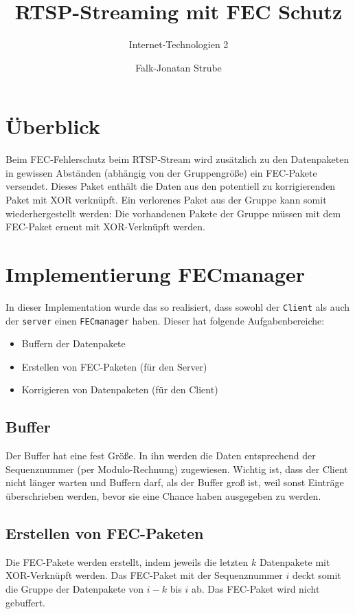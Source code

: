 \documentclass{scrartcl}
\title{RTSP-Streaming mit FEC Schutz}
\subtitle{Internet-Technologien 2}
\author{Falk-Jonatan Strube}
\begin{document}
\maketitle
\tableofcontents
\clearpage
\section{Überblick}

Beim FEC-Fehlerschutz beim RTSP-Stream wird zusätzlich zu den Datenpaketen in gewissen Abständen (abhängig von der Gruppengröße) ein FEC-Pakete versendet. Dieses Paket enthält die Daten aus den potentiell zu korrigierenden Paket mit XOR verknüpft. Ein verlorenes Paket aus der Gruppe kann somit wiederhergestellt werden: Die vorhandenen Pakete der Gruppe müssen mit dem FEC-Paket erneut mit XOR-Verknüpft werden.

\section{Implementierung FECmanager}
In dieser Implementation wurde das so realisiert, dass sowohl der \lstinline`Client` als auch der \lstinline`server` einen \lstinline`FECmanager` haben. Dieser hat folgende Aufgabenbereiche:
\begin{itemize}
\item Buffern der Datenpakete
\item Erstellen von FEC-Paketen (für den Server)
\item Korrigieren von Datenpaketen (für den Client)
\end{itemize}
\subsection{Buffer}
Der Buffer hat eine fest Größe. In ihn werden die Daten entsprechend der Sequenznummer (per Modulo-Rechnung) zugewiesen. Wichtig ist, dass der Client nicht länger warten und Buffern darf, als der Buffer groß ist, weil sonst Einträge überschrieben werden, bevor sie eine Chance haben ausgegeben zu werden.
\subsection{Erstellen von FEC-Paketen}
\label{subsec:erstellenFEC}
Die FEC-Pakete werden erstellt, indem jeweils die letzten $k$ Datenpakete mit XOR-Verknüpft werden. Das FEC-Paket mit der Sequenznummer $i$ deckt somit die Gruppe der Datenpakete von $i-k$ bis $i$ ab. Das FEC-Paket wird nicht gebuffert.
\end{document}
